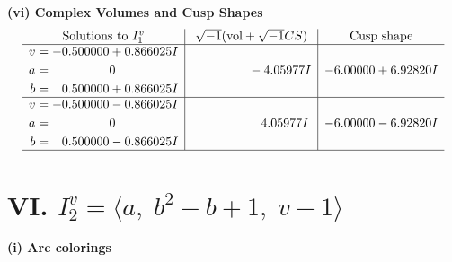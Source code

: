 \documentclass[1p]{elsarticle_modified}
\theoremstyle{definition}
\newcommand{\I}{\sqrt{-1}}
\begin{document}
\newpage\flushleft \textbf{(vi) Complex Volumes and Cusp Shapes}
$$\begin{array}{c|c|c}  
\text{Solutions to }I^v_{1}& \I (\text{vol} + \sqrt{-1}CS) & \text{Cusp shape}\\
 \hline 
\begin{aligned}
v &= -0.500000 + 0.866025 I \\
a &= \phantom{-0.000000 } 0 \\
b &= \phantom{-}0.500000 + 0.866025 I\end{aligned}
 & \phantom{-0.000000 } -4.05977 I & -6.00000 + 6.92820 I \\ \hline\begin{aligned}
v &= -0.500000 - 0.866025 I \\
a &= \phantom{-0.000000 } 0 \\
b &= \phantom{-}0.500000 - 0.866025 I\end{aligned}
 & \phantom{-0.000000 -}4.05977 I & -6.00000 - 6.92820 I\\
 \hline 
 \end{array}$$\newpage\newpage\renewcommand{\arraystretch}{1}
\centering \section*{VI. $I^v_{2}= \langle a,\;b^2- b+1,\;v-1 \rangle$}
\flushleft \textbf{(i) Arc colorings}\\
\end{document}
